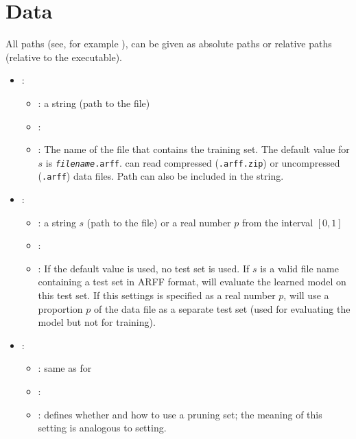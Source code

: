 \section{Data}
All paths (see, for example ), can be given as absolute paths or relative paths (relative to the \clus executable).

\begin{itemize}
    \item {}:
           \begin{itemize}
                \item \optionPossibleValues{}: a string (path to the file)
                \item \optionDefaultValue{}: 
                \item \optionDescrption{}: The name of the file that contains the training set. The default value for $s$ is {\tt {\em filename}.arff}.  \clus{} can read compressed ({\tt .arff.zip}) or uncompressed ({\tt .arff}) data files. Path can also be included in the string. 
           \end{itemize}
    \item {}:
           \begin{itemize}
                \item \optionPossibleValues{}: a string $s$ (path to the file) or a real number $p$ from the interval $[0, 1]$
                \item \optionDefaultValue{}: 
                \item \optionDescrption{}: If the default value  is used, no test set is used.
                 If $s$ is a valid file name containing a test set in ARFF format, \clus{} will evaluate the learned model on this test set.
                 If this settings is specified as a real number $p$, \clus{} will use a proportion $p$ of the data file as a separate test set (used for evaluating the model but not for training).
           \end{itemize}
    \item {}:
           \begin{itemize}
                \item \optionPossibleValues{}: same as for 
                \item \optionDefaultValue{}: 
                \item \optionDescrption{}: defines whether and how to use a pruning set; the meaning of this setting is analogous to  setting.

\end{itemize}
\end{itemize}

